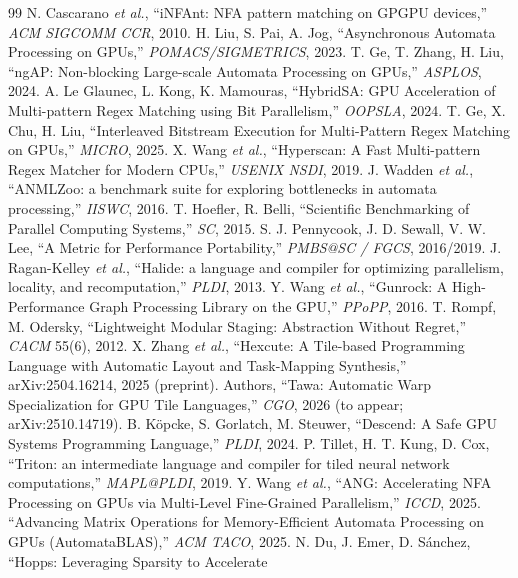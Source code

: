 \documentclass[conference]{IEEEtran}
\begin{document}
\begin{thebibliography}{99}
 N. Cascarano \emph{et al.}, ``iNFAnt: NFA pattern matching on GPGPU
devices,'' \emph{ACM SIGCOMM CCR}, 2010.
 H. Liu, S. Pai, A. Jog, ``Asynchronous Automata Processing on GPUs,''
\emph{POMACS/SIGMETRICS}, 2023.
 T. Ge, T. Zhang, H. Liu, ``ngAP: Non-blocking Large-scale Automata
Processing on GPUs,'' \emph{ASPLOS}, 2024.
 A. Le Glaunec, L. Kong, K. Mamouras, ``HybridSA: GPU Acceleration of
Multi-pattern Regex Matching using Bit Parallelism,'' \emph{OOPSLA}, 2024.
 T. Ge, X. Chu, H. Liu, ``Interleaved Bitstream Execution for
Multi-Pattern Regex Matching on GPUs,'' \emph{MICRO}, 2025.
 X. Wang \emph{et al.}, ``Hyperscan: A Fast Multi-pattern Regex Matcher
for Modern CPUs,'' \emph{USENIX NSDI}, 2019.
 J. Wadden \emph{et al.}, ``ANMLZoo: a benchmark suite for exploring
bottlenecks in automata processing,'' \emph{IISWC}, 2016.
 T. Hoefler, R. Belli, ``Scientific Benchmarking of Parallel Computing
Systems,'' \emph{SC}, 2015.
 S. J. Pennycook, J. D. Sewall, V. W. Lee, ``A Metric for Performance
Portability,'' \emph{PMBS@SC / FGCS}, 2016/2019.
 J. Ragan-Kelley \emph{et al.}, ``Halide: a language and compiler for
optimizing parallelism, locality, and recomputation,'' \emph{PLDI}, 2013.
 Y. Wang \emph{et al.}, ``Gunrock: A High-Performance Graph Processing
Library on the GPU,'' \emph{PPoPP}, 2016.
 T. Rompf, M. Odersky, ``Lightweight Modular Staging: Abstraction Without
Regret,'' \emph{CACM} 55(6), 2012.
 X. Zhang \emph{et al.}, ``Hexcute: A Tile-based Programming Language with
Automatic Layout and Task-Mapping Synthesis,'' arXiv:2504.16214, 2025 (preprint).
 Authors, ``Tawa: Automatic Warp Specialization for GPU Tile Languages,''
\emph{CGO}, 2026 (to appear; arXiv:2510.14719).
 B. K\"opcke, S. Gorlatch, M. Steuwer, ``Descend: A Safe GPU Systems
Programming Language,'' \emph{PLDI}, 2024.
 P. Tillet, H. T. Kung, D. Cox, ``Triton: an intermediate language and
compiler for tiled neural network computations,'' \emph{MAPL@PLDI}, 2019.
 Y. Wang \emph{et al.}, ``ANG: Accelerating NFA Processing on GPUs via
Multi-Level Fine-Grained Parallelism,'' \emph{ICCD}, 2025.
 ``Advancing Matrix Operations for Memory-Efficient Automata
Processing on GPUs (AutomataBLAS),'' \emph{ACM TACO}, 2025.
 N. Du, J. Emer, D. S\'anchez, ``Hopps: Leveraging Sparsity to Accelerate

\end{thebibliography}
\end{document}
